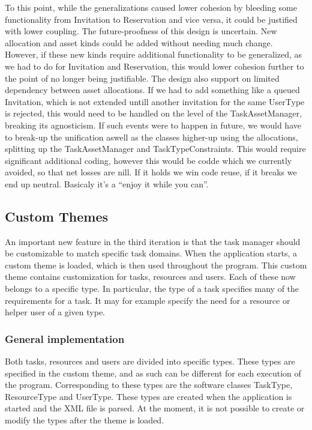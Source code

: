 				To this point, while the generalizations caused lower cohesion by bleeding some functionality from Invitation to Reservation and vice versa, it could be justified with lower coupling. The future-proofness of this design is uncertain. New allocation and asset kinds could be added without needing much change. However, if these new kinds require additional functionality to be generalized, as we had to do for Invitation and Reservation, this would lower cohesion further to the point of no longer being justifiable. The design also support on limited dependency between asset allocations. If we had to add something like a queued Invitation, which is not extended untill another invitation for the same UserType is rejected, this would need to be handled on the level of the TaskAssetManager, breaking its agnosticism. If such events were to happen in future, we would have to break-up the unification aswell as the classes higher-up using the allocations, splitting up the TaskAssetManager and TaskTypeConstraints. This would require significant additional coding, however this would be codde which we currently avoided, so that net losses are nill. If it holds we win code reuse, if it breaks we end up neutral. Basicaly it's a ``enjoy it while you can''.
				
				
				
		
		
		
		
		\subsection{Custom Themes}
			An important new feature in the third iteration is that the task manager should be customizable to match specific task domains. When the application starts, a custom theme is loaded, which is then used throughout the program. This custom theme contains customization for tasks, resources and users. Each of these now belongs to a specific type. In particular, the type of a task specifies many of the requirements for a task. It may for example specify the need for a resource or helper user of a given type.
			\subsubsection{General implementation}
				Both tasks, resources and users are divided into specific types. These types are specified in the custom theme, and as such can be different for each execution of the program. Corresponding to these types are the software classes TaskType, ResourceType and UserType. These types are created when the application is started and the XML file is parsed. At the moment, it is not possible to create or modify the types after the theme is loaded. 
				
